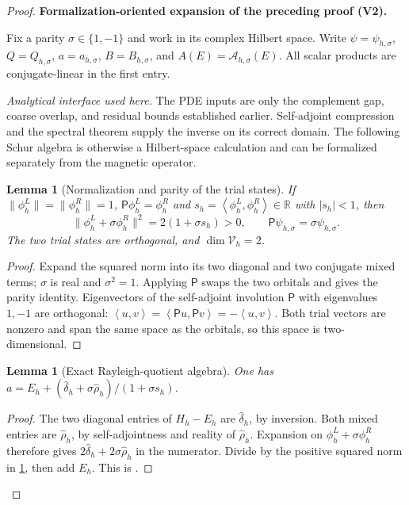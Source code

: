 \documentclass[11pt]{article}
\newtheorem{lemma}[theorem]{Lemma}
\newcommand{\formalisationparentid}{X}
\newenvironment{formalisationaddition}[1]{\par\medskip\begingroup\color{blue}\def\formalisationparentid{#1}\setcounter{formalizationsublemma}{0}\let\lemma\formalizationsublemma\let\endlemma\endformalizationsublemma
  \def\Eo{\mathcal E_h^\circ}\def\EE{\mathcal E_h}\def\phio{\phi_h^\circ}\def\phih{\phi_h}\def\Ho{H_h^{\rm atom}(v^\circ)}\def\Ha{H_h^{\rm atom}}\def\HL{H_h^{L}}\def\Dh{D_h}\def\Log{\operatorname{Log}}\def\ellh{\ell_h}\def\Gp{G_{p,h}}\def\Ast{A_{*,h}}\def\ahat{\widehat{\mathfrak a}_h}\def\ah{\mathfrak a_h}\def\rh{\widehat\rho_h}\def\deltah{\widehat\delta_h}\def\oldref##1{\textup{(##1)}}\def\interface##1{\par\noindent\textit{Analytical interface used here.} ##1\par}\def\finish{\par\noindent\textit{Conclusion of the formalization-oriented expansion.} }\par\noindent\textbf{Formalization-oriented expansion of the preceding proof (V2).}\par\smallskip
}{\par\endgroup\medskip
}
\newcommand{\R}{\mathbb R}
\newcommand{\ip}[2]{\left\langle #1,#2\right\rangle}
\begin{document}
\begin{proof}
\begin{formalisationaddition}{T4.7}
Fix a parity $\sigma\in\{1,-1\}$ and work in its complex Hilbert space.
Write $\psi=\psi_{h,\sigma}$, $Q=Q_{h,\sigma}$, $a=a_{h,\sigma}$,
$B=B_{h,\sigma}$, and $A(E)=\mathcal A_{h,\sigma}(E)$.
All scalar products are conjugate-linear in the first entry.

\interface{The PDE inputs are only the complement gap, coarse overlap,
and residual bounds established earlier. Self-adjoint compression and the
spectral theorem supply the inverse on its correct domain. The following
Schur algebra is otherwise a Hilbert-space calculation and can be
formalized separately from the magnetic operator.}

\begin{lemma}[Normalization and parity of the trial states]\label{sublemma:T4-7-trial-normalization}
If $\|\phi_h^L\|=\|\phi_h^R\|=1$, $\mathsf P\phi_h^L=\phi_h^R$ and
$s_h=\ip{\phi_h^L}{\phi_h^R}\in\R$ with $|s_h|<1$, then
\[
 \|\phi_h^L+\sigma\phi_h^R\|^2=2(1+\sigma s_h)>0,
 \qquad \mathsf P\psi_{h,\sigma}=\sigma\psi_{h,\sigma}.
\]
The two trial states are orthogonal, and $\dim\mathcal V_h=2$.
\end{lemma}
\begin{proof}
Expand the squared norm into its two diagonal and two conjugate mixed
terms; $\sigma$ is real and $\sigma^2=1$. Applying $\mathsf P$ swaps
the two orbitals and gives the parity identity. Eigenvectors of the
self-adjoint involution $\mathsf P$ with eigenvalues $1,-1$ are orthogonal:
$\ip uv=\ip{\mathsf Pu}{\mathsf Pv}=-\ip uv$.
Both trial vectors are nonzero and span the same space as the orbitals,
so this space is two-dimensional.
\end{proof}

\begin{lemma}[Exact Rayleigh-quotient algebra]\label{sublemma:T4-7-rayleigh}
One has
$a=E_h+(\deltah+\sigma\rh)/(1+\sigma s_h)$.
\end{lemma}
\begin{proof}
The two diagonal entries of $H_h-E_h$ are $\deltah$, by inversion.
Both mixed entries are $\rh$, by self-adjointness and reality of
$\rh$. Expansion on $\phi_h^L+\sigma\phi_h^R$ therefore gives
$2\deltah+2\sigma\rh$ in the numerator. Divide by the positive squared
norm in \ref{sublemma:T4-7-trial-normalization}, then add $E_h$.
This is .
\end{proof}


\end{formalisationaddition}
\end{proof}
\end{document}
